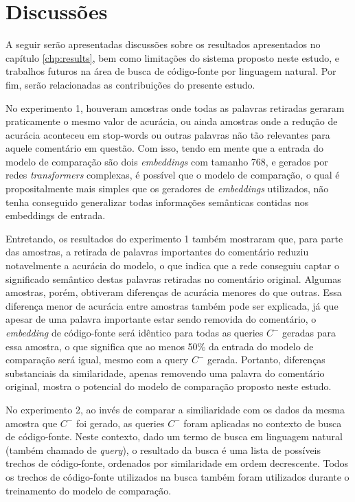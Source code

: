 \chapter{Discussões}
\label{chp:discussions}

A seguir serão apresentadas discussões sobre os resultados apresentados no capítulo \ref{chp:results}, bem como limitações do sistema proposto neste estudo, e trabalhos futuros na área de busca de código-fonte por linguagem natural. Por fim, serão relacionadas as contribuições do presente estudo.

No experimento 1, houveram amostras onde todas as palavras retiradas geraram praticamente o mesmo valor de acurácia, ou ainda amostras onde a redução de acurácia aconteceu em stop-words ou outras palavras não tão relevantes para aquele comentário em questão. Com isso, tendo em mente que a entrada do modelo de comparação são dois \textit{embeddings} com tamanho 768, e gerados por redes \textit{transformers} complexas, é possível que o modelo de comparação, o qual é propositalmente mais simples que os geradores de \textit{embeddings} utilizados, não tenha conseguido generalizar todas informações semânticas contidas nos embeddings de entrada.

Entretando, os resultados do experimento 1 também mostraram que, para parte das amostras, a retirada de palavras importantes do comentário reduziu notavelmente a acurácia do modelo, o que indica que a rede conseguiu captar o significado semântico destas palavras retiradas no comentário original. Algumas amostras, porém, obtiveram diferenças de acurácia menores do que outras. Essa diferença menor de acurácia entre amostras também pode ser explicada, já que apesar de uma palavra importante estar sendo removida do comentário, o \textit{embedding} de código-fonte será idêntico para todas as queries $C^-$ geradas para essa amostra, o que significa que ao menos 50\% da entrada do modelo de comparação será igual, mesmo com a query $C^-$ gerada. Portanto, diferenças substanciais da similaridade, apenas removendo uma palavra do comentário original, mostra o potencial do modelo de comparação proposto neste estudo.

No experimento 2, ao invés de comparar a similiaridade com os dados da mesma amostra que $C^-$ foi gerado, as queries $C^-$ foram aplicadas no contexto de busca de código-fonte. Neste contexto, dado um termo de busca em linguagem natural (também chamado de \textit{query}), o resultado da busca é uma lista de possíveis trechos de código-fonte, ordenados por similaridade em ordem decrescente. Todos os trechos de código-fonte utilizados na busca também foram utilizados durante o treinamento do modelo de comparação.

